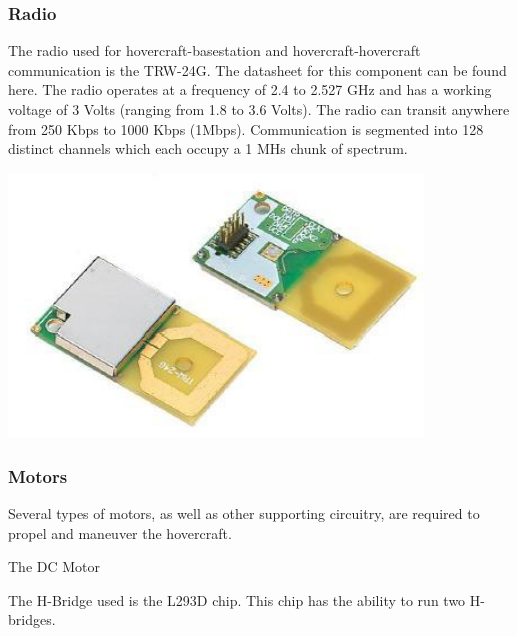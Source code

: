 \subsubsection{Radio}
The radio used for hovercraft-basestation and hovercraft-hovercraft communication is the TRW-24G.  The datasheet for this component can be found here.  The radio operates at a frequency of 2.4 to 2.527 GHz and has a working voltage of 3 Volts (ranging from 1.8 to 3.6 Volts).  The radio can transit anywhere from 250 Kbps to 1000 Kbps (1Mbps).  Communication is segmented into 128 distinct channels which each occupy a 1 MHs chunk of spectrum. 

\begin{minipage}{6.5in}
  \begin{center}
    \includegraphics[width=110mm]{imageSources/radio.png}
  \end{center}
  \label{radioFig}
\end{minipage}

\subsubsection{Motors}
Several types of motors, as well as other supporting circuitry, are required to propel and maneuver the hovercraft.  

The DC Motor

The H-Bridge used is the L293D chip. This chip has the ability to run two H-bridges. 

